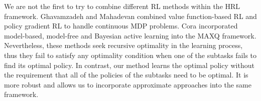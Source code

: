 



We are not the first to try to combine different RL methods within the HRL framework. Ghavamzadeh and Mahadevan \cite{HybridPolicy} combined value function-based RL and policy gradient RL to handle
continuous MDP problems. Cora \cite{Vlad} incorporated model-based, model-free and Bayesian active learning into the MAXQ framework.
Nevertheless, these methods seek recursive optimality in the learning process, 
thus they fail to satisfy any optimality condition when one of the subtasks
fails to find its optimal policy.
In contrast, our method learns the optimal policy without the requirement that 
all of the policies of the subtasks need to be optimal. It is more robust and allows us to incorporate approximate
approaches into the same framework.


